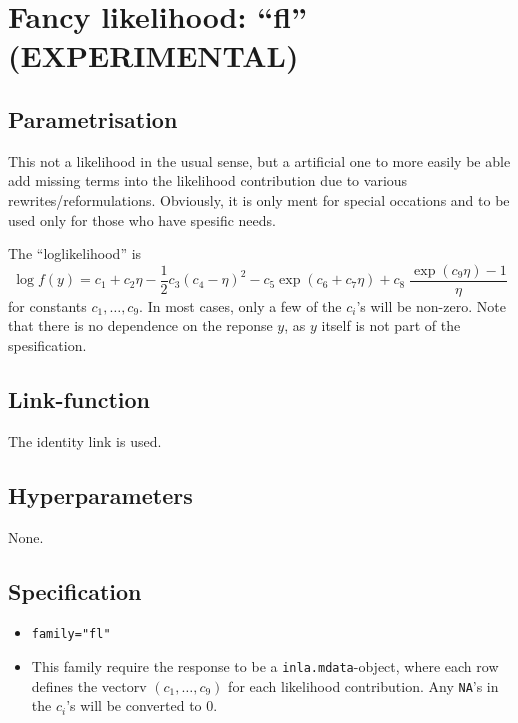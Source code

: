 \documentclass[a4paper,11pt]{article}
\begin{document}
\section*{Fancy likelihood: ``fl'' (EXPERIMENTAL)}

\subsection*{Parametrisation}

This not a likelihood in the usual sense, but a artificial one to more
easily be able add missing terms into the likelihood contribution due
to various rewrites/reformulations. Obviously, it is only ment for
special occations and to be used only for those who have spesific
needs.

The ``loglikelihood'' is
\begin{displaymath}
    \log f(y) = c_1 + c_2 \eta -\frac{1}{2} c_3 (c_4 - \eta)^{2} -
    c_5 \exp(c_6 + c_7 \eta) + c_8\;\frac{\exp(c_9 \eta)-1}{\eta}
\end{displaymath}
for constants $c_1, \ldots, c_9$. In most cases, only a few of the
$c_i$'s will be non-zero. Note that there is no dependence on the
reponse $y$, as $y$ itself is not part of the spesification.

\subsection*{Link-function}

The identity link is used.

\subsection*{Hyperparameters}

None.

\subsection*{Specification}

\begin{itemize}
\item \texttt{family="fl"}
\item This family require the response to be a
    \texttt{inla.mdata}-object, where each row defines the vectorv
    $(c_1, \ldots, c_9)$ for each likelihood contribution. Any
    \texttt{NA}'s in the $c_i$'s will be converted to 0.
\end{itemize}
\end{document}
